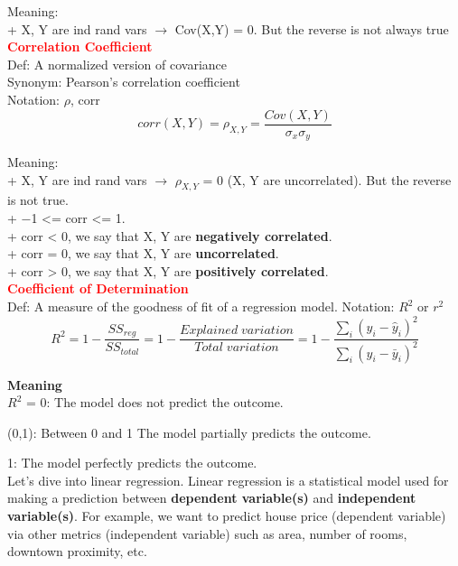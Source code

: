 \documentclass[12pt,a4paper]{article}
\newcommand{\red}[1]{\textcolor{red}{\textbf{#1}}}
\newcommand{\subscript}[1]{_{{#1}}}
\begin{document}
\noindent Meaning:\\
+ X, Y are ind rand vars $\rightarrow$ Cov(X,Y) = 0. But the reverse is not always true\\

\noindent\textbf{\red{Correlation Coefficient}}\\
Def: A normalized version of covariance\\
Synonym: Pearson's correlation coefficient\\
Notation: $\rho$, corr
\begin{displaymath}
corr(X,Y) = \rho\subscript{X,Y} = \frac{Cov(X,Y)}{\sigma\subscript{x}\sigma\subscript{y}}
\end{displaymath}

\noindent Meaning:\\
+ X, Y are ind rand vars $\rightarrow$ $\rho\subscript{X,Y}$ = 0 (X, Y are uncorrelated). But the reverse is not true.\\
+ −1 <= corr <= 1.\\
+ corr < 0, we say that X, Y are \textbf{negatively correlated}.\\
+ corr = 0, we say that X, Y are \textbf{uncorrelated}.\\
+ corr > 0, we say that X, Y are \textbf{positively correlated}.\\

\noindent \textbf{\red{Coefficient of Determination}}\\
Def: A measure of the goodness of fit of a regression model.
Notation: $R^2$ or $r^2$\\
\begin{displaymath}
R^2 = 1 - \frac{SS\subscript{reg}}{SS\subscript{total}} =
1 - \frac{Explained\;variation}{Total\;variation}=
1 - \frac
{\sum\limits_{i}^{} (y\subscript{i} - \hat{y}\subscript{i})^2}
{\sum\limits_{i}^{} (y\subscript{i} - \bar{y}\subscript{i})^2}
\end{displaymath}

\noindent\textbf{Meaning}\\
$R^2$ = 0: The model does not predict the outcome.

\hspace{2mm} (0,1): Between 0 and 1	The model partially predicts the outcome.

\hspace{5mm}1: The model perfectly predicts the outcome.\\

\noindent Let's dive into linear regression. Linear regression is a statistical model used for making a prediction between \textbf{dependent variable(s)} and \textbf{independent variable(s)}. For example, we want to predict house price (dependent variable) via other metrics (independent variable) such as area, number of rooms, downtown proximity, etc.\\
\end{document}
